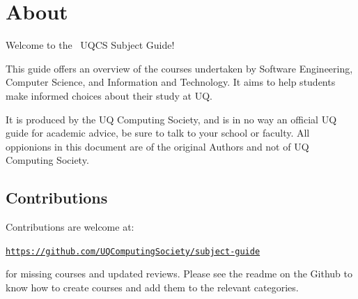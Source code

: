 \section{About}
\hypertarget{core:about}{}
Welcome to the \the\year\ UQCS Subject Guide!

This guide offers an overview of the courses undertaken by Software Engineering, 
Computer Science, and Information and Technology. It aims to help students make 
informed choices about their study at UQ.

It is produced by the UQ Computing Society, and is in no way an official UQ guide  
for academic advice, be sure to talk to your school or faculty. All oppionions in this 
document are of the original Authors and not of UQ Computing Society.

\subsection{Contributions}

Contributions are welcome at:

\href{https://github.com/UQComputingSociety/subject-guide}{\nolinkurl{https://github.com/UQComputingSociety/subject-guide}}\ 

for missing courses and updated reviews. Please see the readme on the Github to know 
how to create courses and add them to the relevant categories.